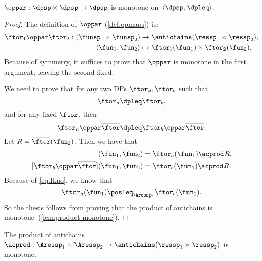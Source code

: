 \begin{lemma}
    \label{lem:par-monotone}$\oppar:\dpsp\times\dpsp\rightarrow\dpsp$
    is monotone on~$\langle\dpsp,\dpleq\rangle$.
\end{lemma}
\begin{proof}
    The definition of $\oppar$ (\cref{def:opmaps}) is:
    \begin{align*}
        \ftor_{1}\oppar\ftor_{2}:(\funsp_{1}\times\funsp_{2}) & \rightarrow\antichains(\ressp_{1}\times\ressp_{2}),  \\
        \left\langle \fun_{1},\fun_{2}\right\rangle           & \mapsto\ftor_{1}(\fun_{1})\times\ftor_{2}(\fun_{2}).
    \end{align*}
    Because of symmetry, it suffices to prove that $\oppar$ is monotone
    in the first argument, leaving the second fixed.

    We need to prove that for any two DPs $\ftor_{a},\ftor_{b}$ such
    that
    \begin{equation}
        \ftor_{a}\dpleq\ftor_{b},\label{eq:Ikno}
    \end{equation}
    and for any fixed $\overline{\ftor}$, then
    \[
        \ftor_{a}\oppar\overline{\ftor}\dpleq\ftor_{b}\oppar\overline{\ftor}.
    \]
    Let $R=\overline{\ftor}(\fun_{2})$.
    Then we have that
    \begin{align*}
        [\ftor_{a}\oppar\overline{\ftor}]
        (\fun_{1},\fun_{2})
                                                             & =\ftor_{a}(\fun_{1})\acprod R,\\{}
        [\ftor_{b}\oppar\overline{\ftor}](\fun_{1},\fun_{2}) & =\ftor_{b}(\fun_{1})\acprod R.
    \end{align*}
    Because of \cref{eq:Ikno}, we know that
    \[
        \ftor_{a}(\fun_{1})\posleq_{\Aressp_{1}}\ftor_{b}(\fun_{1}).
    \]
    So the thesis follows from proving that the product of antichains
    is monotone~(\cref{lem:product-monotone}).
\end{proof}
\begin{lemma}
    \label{lem:product-monotone}
    The product of antichains~$\acprod:\Aressp_{1}\times\Aressp_{2}\rightarrow\antichains(\ressp_{1}\times\ressp_{2})$
    is monotone.
\end{lemma}

